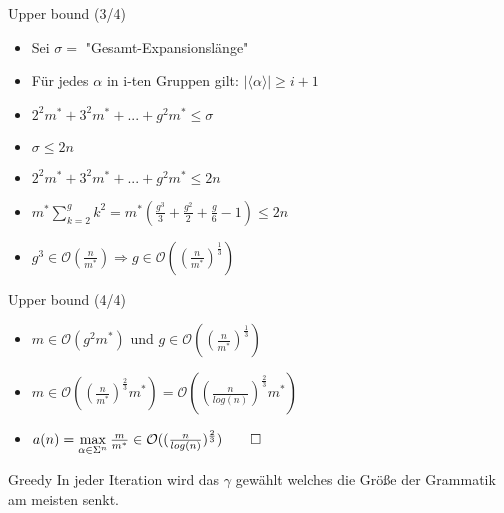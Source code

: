 \begin{frame}{\FrameName}
	\begin{block}{Upper bound (3/4)}
    \begin{itemize}[<+->]
      \item Sei $\sigma = $ "Gesamt-Expansionslänge"
      \item Für jedes $\alpha$ in i-ten Gruppen gilt: $|\langle \alpha \rangle | \ge i+1$ 
      \item $2^2m^* + 3^2m^* + ... + g^2m^* \le \sigma$
      \item $\sigma \le 2n$
      \item $2^2m^* + 3^2m^* + ... + g^2m^* \le 2n$
      \item $m^* \sum_{k=2}^{g}k^2 = m^* (\frac{g^3}{3} + \frac{g^2}{2} + \frac{g}{6} - 1) \le 2n$
      \item $g^3 \in \mathcal{O}(\frac{n}{m^*}) \Rightarrow g \in \mathcal{O}((\frac{n}{m^*})^{\frac{1}{3}})$
    \end{itemize}
\end{block}
\end{frame}

\begin{frame}{\FrameName}
	\begin{block}{Upper bound (4/4)}
    \begin{itemize}[<+->]
      \item $m\in \mathcal{O}(g^2 m^*)$ und $g \in \mathcal{O}((\frac{n}{m^*})^{\frac{1}{3}})$
      \item $m \in \mathcal{O}((\frac{n}{m^*})^{\frac{2}{3}} m^*) = \mathcal{O}((\frac{n}{log (n)})^{\frac{2}{3}} m^*)$
      \item $a(n) = \max\limits_{\alpha \in \Sigma^n} \frac{m}{m^*} \in \mathcal{O}((\frac{n}{log(n)})^{\frac{2}{3}}) \qed$
    \end{itemize}
\end{block}
\end{frame}

\begin{frame}{\FrameName}
	\begin{block}{Greedy}
    \Gap
    In jeder Iteration wird das $\gamma $ gewählt welches die Größe der Grammatik am meisten senkt.
\end{block}
\end{frame}
